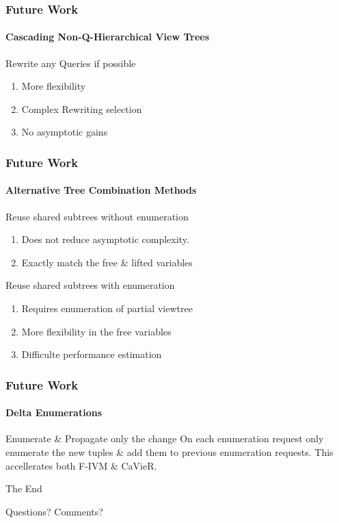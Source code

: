 \documentclass[
	11pt, %
]{beamer}
\begin{document}
\begin{frame}
	\frametitle{Future Work}
	\framesubtitle{Cascading Non-Q-Hierarchical View Trees}
	\begin{block}{Rewrite any Queries if possible}
		\begin{enumerate}
			\item More flexibility
			\item Complex Rewriting selection
			\item No asymptotic gains
		\end{enumerate}
	\end{block}
\end{frame}

\begin{frame}
	\frametitle{Future Work}
	\framesubtitle{Alternative Tree Combination Methods}
	\begin{block}{Reuse shared subtrees without enumeration}
		\begin{enumerate}
			\item Does not reduce asymptotic complexity.
			\item Exactly match the free \& lifted variables
		\end{enumerate}
	\end{block}
	
		\begin{block}{Reuse shared subtrees with enumeration}
		\begin{enumerate}
			\item Requires enumeration of partial viewtree
			\item More flexibility in the free variables
			\item Difficulte performance estimation
		\end{enumerate}
	\end{block}
\end{frame}

\begin{frame}
	\frametitle{Future Work}
	\framesubtitle{Delta Enumerations}
	\begin{block}{Enumerate \& Propagate only the change}
		On each enumeration request only enumerate the new tuples \& add them to previous enumeration requests.
		This accellerates both F-IVM \& CaVieR.
	\end{block}
\end{frame}

\begin{frame}[plain] %
	\begin{center}
		{\Huge The End}
		
		\bigskip\bigskip %
		
		{\LARGE Questions? Comments?}
	\end{center}
\end{frame}

\end{document}
